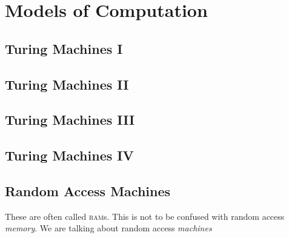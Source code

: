 
\chapter{Models of Computation}



\section{Turing Machines I}

\section{Turing Machines II}

\section{Turing Machines III}

\section{Turing Machines IV}


\section{Random Access Machines}

These are often called \textsc{ram}s. 
This is not to be confused with random access \textit{memory}.
We are talking about random access \textit{machines}